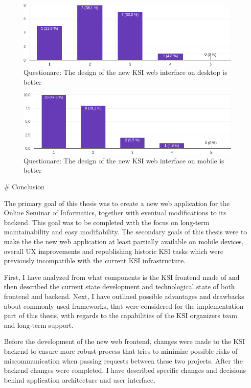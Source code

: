 \documentclass[
  digital, %
  oneside, %
  lof,     %
  nolot,     %
]{fithesis4}
\begin{document}
{\begin{figure}
\includegraphics[width=\textwidth]{assets/img/questionare/pc-ui}
\caption{Questionare: The design of the new KSI web interface on desktop is better}
\label{fig:q-ui-pc}
\end{figure}

\begin{figure}
\includegraphics[width=\textwidth]{assets/img/questionare/mobile-ui}
\caption{Questionare: The design of the new KSI web interface on mobile is better}
\label{fig:q-ui-mobile}
\end{figure}

# Conclusion

The primary goal of this thesis was to create a new web application for the Online Seminar of Informatics, together with eventual modifications to its backend. This goal was to be completed with the focus on long-term maintainability and easy modifiability. The secondary goals of this thesis were to make the the new web application at least partially available on mobile devices, overall UX improvements and republishing historic KSI tasks which were previously incompatible with the current KSI infrastructure.

First, I have analyzed from what components is the KSI frontend made of and then described the current state development and technological state of both frontend and backend. Next, I have outlined possible advantages and drawbacks about commonly used frameworks, that were considered for the implementation part of this thesis, with regards to the capabilities of the KSI organizers team and long-term support.

Before the development of the new web frontend, changes were made to the KSI backend to ensure more robust process that tries to minimize possible risks of miscommunication when passing requests between these two projects. After the backend changes were completed, I have described specific changes and decisions behind application architecture and user interface.

}
\end{document}
